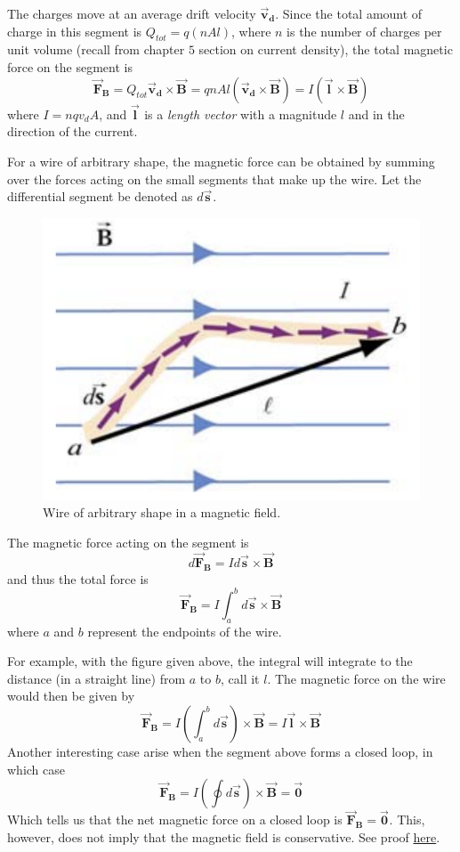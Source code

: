 \documentclass[11pt, letterpaper]{article}
\theoremstyle{definition}
\theoremstyle{remark}
\newcommand{\bv}[2][]{\bm{\vec{#2}_{#1}}}
\begin{document}
The charges move at an average drift velocity $\bv[d]{v}$. Since the total amount of charge in this segment is $Q_{tot} = q(nAl)$, where $n$ is the number of charges per unit volume (recall from chapter $5$ section on current density), the total magnetic force on the segment is \[\bv[B]{F} = Q_{tot}\bv[d]{v}\times\bv{B} = qnAl(\bv[d]{v}\times\bv{B}) = I(\bv{l}\times\bv{B})\] where $I = nqv_dA$, and $\bv{l}$ is a \textit{length vector} with a magnitude $l$ and in the direction of the current.

For a wire of arbitrary shape, the magnetic force can be obtained by summing over the forces acting on the small segments that make up the wire. Let the differential segment be denoted as $d\bv{s}$.
\begin{figure}[h!]
	\centering
	\includegraphics[scale=0.6]{arbitrary}
	\caption{Wire of arbitrary shape in a magnetic field.}
	\label{fig:arbitrary}
\end{figure}

The magnetic force acting on the segment is \[d\bv[B]{F} = Id\bv{s}\times\bv{B}\] and thus the total force is
\begin{equation}\label{eqn:arbitrary}
	\boxed{\bv[B]{F} = I\int_a^b d\bv{s}\times\bv{B}}
\end{equation}
where $a$ and $b$ represent the endpoints of the wire.

For example, with the figure given above, the integral will integrate to the distance (in a straight line) from $a$ to $b$, call it $l$. The magnetic force on the wire would then be given by \[\bv[B]{F} = I\left(\int_a^bd\bv{s}\right)\times\bv{B} = I\bv{l}\times\bv{B}\] Another interesting case arise when the segment above forms a closed loop, in which case \[\bv[B]{F} = I\left(\oint d\bv{s}\right)\times\bv{B} = \bv{0}\] Which tells us that the net magnetic force on a closed loop is $\bv[B]{F} = \bv{0}$. This, however, does not imply that the magnetic field is conservative. See proof \hyperref[subsec:non-conservative]{here}.
\end{document}
